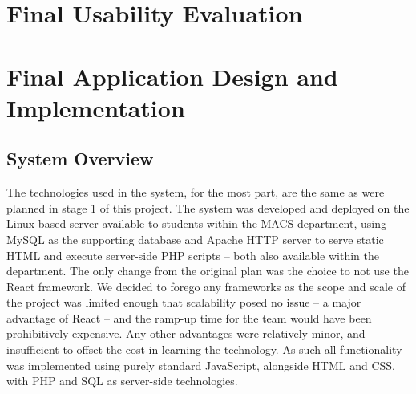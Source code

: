 \documentclass[11pt, oneside, a4paper]{report}   %
\begin{document}
\chapter{Final Usability Evaluation}


\chapter{Final Application Design and Implementation}
\pagebreak
\minitoc
\pagebreak
\section{System Overview}

The technologies used in the system, for the most part, are the same as were planned in stage 1 of this project. The system was developed and deployed on the Linux-based server available to students within the MACS department, using MySQL as the supporting database and Apache HTTP server to serve static HTML and execute server-side PHP scripts -- both also available within the department. The only change from the original plan was the choice to not use the React framework. We decided to forego any frameworks as the scope and scale of the project was limited enough that scalability posed no issue -- a major advantage of React -- and the ramp-up time for the team would have been prohibitively expensive. Any other advantages were relatively minor, and insufficient to offset the cost in learning the technology. As such all functionality was implemented using purely standard JavaScript, alongside HTML and CSS, with PHP and SQL as server-side technologies.
\end{document}
